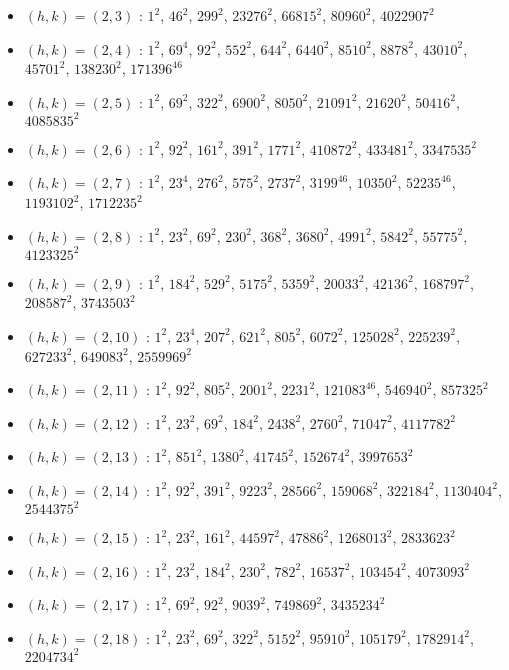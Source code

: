 \begin{itemize}
\item $(h,k)=(2,3)$ : $1^{2}$, $46^{2}$, $299^{2}$, $23276^{2}$, $66815^{2}$, $80960^{2}$, $4022907^{2}$
\item $(h,k)=(2,4)$ : $1^{2}$, $69^{4}$, $92^{2}$, $552^{2}$, $644^{2}$, $6440^{2}$, $8510^{2}$, $8878^{2}$, $43010^{2}$, $45701^{2}$, $138230^{2}$, $171396^{46}$
\item $(h,k)=(2,5)$ : $1^{2}$, $69^{2}$, $322^{2}$, $6900^{2}$, $8050^{2}$, $21091^{2}$, $21620^{2}$, $50416^{2}$, $4085835^{2}$
\item $(h,k)=(2,6)$ : $1^{2}$, $92^{2}$, $161^{2}$, $391^{2}$, $1771^{2}$, $410872^{2}$, $433481^{2}$, $3347535^{2}$
\item $(h,k)=(2,7)$ : $1^{2}$, $23^{4}$, $276^{2}$, $575^{2}$, $2737^{2}$, $3199^{46}$, $10350^{2}$, $52235^{46}$, $1193102^{2}$, $1712235^{2}$
\item $(h,k)=(2,8)$ : $1^{2}$, $23^{2}$, $69^{2}$, $230^{2}$, $368^{2}$, $3680^{2}$, $4991^{2}$, $5842^{2}$, $55775^{2}$, $4123325^{2}$
\item $(h,k)=(2,9)$ : $1^{2}$, $184^{2}$, $529^{2}$, $5175^{2}$, $5359^{2}$, $20033^{2}$, $42136^{2}$, $168797^{2}$, $208587^{2}$, $3743503^{2}$
\item $(h,k)=(2,10)$ : $1^{2}$, $23^{4}$, $207^{2}$, $621^{2}$, $805^{2}$, $6072^{2}$, $125028^{2}$, $225239^{2}$, $627233^{2}$, $649083^{2}$, $2559969^{2}$
\item $(h,k)=(2,11)$ : $1^{2}$, $92^{2}$, $805^{2}$, $2001^{2}$, $2231^{2}$, $121083^{46}$, $546940^{2}$, $857325^{2}$
\item $(h,k)=(2,12)$ : $1^{2}$, $23^{2}$, $69^{2}$, $184^{2}$, $2438^{2}$, $2760^{2}$, $71047^{2}$, $4117782^{2}$
\item $(h,k)=(2,13)$ : $1^{2}$, $851^{2}$, $1380^{2}$, $41745^{2}$, $152674^{2}$, $3997653^{2}$
\item $(h,k)=(2,14)$ : $1^{2}$, $92^{2}$, $391^{2}$, $9223^{2}$, $28566^{2}$, $159068^{2}$, $322184^{2}$, $1130404^{2}$, $2544375^{2}$
\item $(h,k)=(2,15)$ : $1^{2}$, $23^{2}$, $161^{2}$, $44597^{2}$, $47886^{2}$, $1268013^{2}$, $2833623^{2}$
\item $(h,k)=(2,16)$ : $1^{2}$, $23^{2}$, $184^{2}$, $230^{2}$, $782^{2}$, $16537^{2}$, $103454^{2}$, $4073093^{2}$
\item $(h,k)=(2,17)$ : $1^{2}$, $69^{2}$, $92^{2}$, $9039^{2}$, $749869^{2}$, $3435234^{2}$
\item $(h,k)=(2,18)$ : $1^{2}$, $23^{2}$, $69^{2}$, $322^{2}$, $5152^{2}$, $95910^{2}$, $105179^{2}$, $1782914^{2}$, $2204734^{2}$

\end{itemize}
